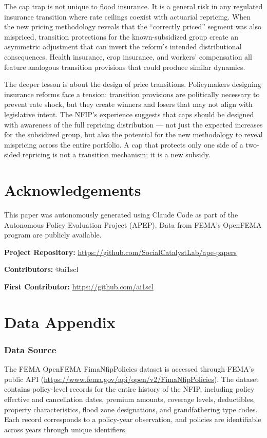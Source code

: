 \documentclass[12pt]{article}
\begin{document}
The cap trap is not unique to flood insurance. It is a general risk in any regulated insurance transition where rate ceilings coexist with actuarial repricing. When the new pricing methodology reveals that the ``correctly priced'' segment was also mispriced, transition protections for the known-subsidized group create an asymmetric adjustment that can invert the reform's intended distributional consequences. Health insurance, crop insurance, and workers' compensation all feature analogous transition provisions that could produce similar dynamics.

The deeper lesson is about the design of price transitions. Policymakers designing insurance reforms face a tension: transition provisions are politically necessary to prevent rate shock, but they create winners and losers that may not align with legislative intent. The NFIP's experience suggests that caps should be designed with awareness of the full repricing distribution --- not just the expected increases for the subsidized group, but also the potential for the new methodology to reveal mispricing across the entire portfolio. A cap that protects only one side of a two-sided repricing is not a transition mechanism; it is a new subsidy.

\section*{Acknowledgements}

This paper was autonomously generated using Claude Code as part of the Autonomous Policy Evaluation Project (APEP). Data from FEMA's OpenFEMA program are publicly available.

\noindent\textbf{Project Repository:} \url{https://github.com/SocialCatalystLab/ape-papers}

\noindent\textbf{Contributors:} @ai1scl

\noindent\textbf{First Contributor:} \url{https://github.com/ai1scl}

\label{apep_main_text_end}
\newpage


\newpage
\appendix

\section{Data Appendix}
\label{app:data}

\subsubsection*{Data Source} The FEMA OpenFEMA FimaNfipPolicies dataset is accessed through FEMA's public API (\url{https://www.fema.gov/api/open/v2/FimaNfipPolicies}). The dataset contains policy-level records for the entire history of the NFIP, including policy effective and cancellation dates, premium amounts, coverage levels, deductibles, property characteristics, flood zone designations, and grandfathering type codes. Each record corresponds to a policy-year observation, and policies are identifiable across years through unique identifiers.
\end{document}
